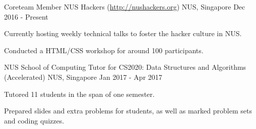 

\begin{cventries}


  \cventry
  {Coreteam Member} %
  {NUS Hackers (\url{http://nushackers.org})} %
  {NUS, Singapore} %
  {Dec 2016 - Present} %
  { %
    \begin{cvitems}
    \item {Currently hosting weekly technical talks to foster the hacker culture in NUS.}
    \item {Conducted a HTML/CSS workshop for around 100 participants.}
    \end{cvitems}
  }


  \cventry
  {NUS School of Computing} %
  {Tutor for CS2020: Data Structures and Algorithms (Accelerated)} %
  {NUS, Singapore} %
  {Jan 2017 - Apr 2017} %
  { %
    \begin{cvitems}
    \item {Tutored 11 students in the span of one semester.}
    \item {Prepared slides and extra problems for students, as well as marked problem sets and coding quizzes.}
    \end{cvitems}
  }


\end{cventries}
